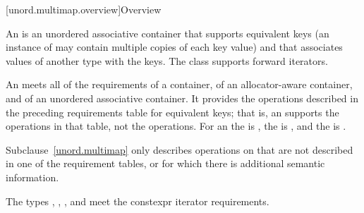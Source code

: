 [unord.multimap.overview]{Overview}

\pnum
{}%
%
An  is an unordered associative container
that supports equivalent keys (an instance of  may contain
multiple copies of each key value) and that associates values of
another type  with the keys.
The  class
supports forward iterators.

\pnum
An  meets all of the requirements
of a container,
of an allocator-aware container, and
of an unordered associative container.
It provides the operations described in the
preceding requirements table for equivalent keys; that is, an 
supports the  operations in that table, not the  operations.
For an  the  is ,
the  is ,
and the  is .

\pnum
Subclause~\ref{unord.multimap} only describes operations on 
that are not described in one of the requirement tables, or for which
there is additional semantic information.

\pnum
The types , ,
, and  meet
the constexpr iterator requirements.


